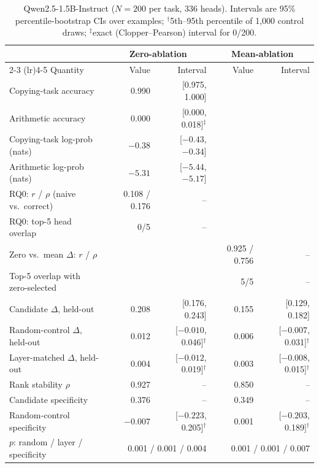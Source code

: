 \documentclass{article}
\begin{document}
\begin{table}[h]
  \caption{Qwen2.5-1.5B-Instruct ($N=200$ per task, 336 heads). Intervals
  are 95\% percentile-bootstrap CIs over examples; $^\dagger$5th--95th
  percentile of 1{,}000 control draws; $^\ddagger$exact (Clopper--Pearson)
  interval for 0/200.}
  \label{tab:qwen}
  \centering
  \small
  \setlength{\tabcolsep}{4pt}
  \begin{tabular}{lrrrr}
    \toprule
    & \multicolumn{2}{c}{Zero-ablation} & \multicolumn{2}{c}{Mean-ablation} \\
    \cmidrule(lr){2-3} \cmidrule(lr){4-5}
    Quantity & Value & Interval & Value & Interval \\
    \midrule
    Copying-task accuracy & 0.990 & [0.975, 1.000] & & \\
    Arithmetic accuracy & 0.000 & [0.000, 0.018]$^\ddagger$ & & \\
    Copying-task log-prob (nats) & $-0.38$ & [$-0.43$, $-0.34$] & & \\
    Arithmetic log-prob (nats) & $-5.31$ & [$-5.44$, $-5.17$] & & \\
    RQ0: $r$ / $\rho$ (naive vs.\ correct) & 0.108 / 0.176 & -- & & \\
    RQ0: top-5 head overlap & 0/5 & -- & & \\
    Zero vs.\ mean $\Delta$: $r$ / $\rho$ & & & 0.925 / 0.756 & -- \\
    Top-5 overlap with zero-selected & & & 5/5 & -- \\
    Candidate $\Delta$, held-out & 0.208 & [0.176, 0.243] & 0.155 & [0.129, 0.182] \\
    Random-control $\Delta$, held-out & 0.012 & [$-0.010$, 0.046]$^\dagger$ & 0.006 & [$-0.007$, 0.031]$^\dagger$ \\
    Layer-matched $\Delta$, held-out & 0.004 & [$-0.012$, 0.019]$^\dagger$ & 0.003 & [$-0.008$, 0.015]$^\dagger$ \\
    Rank stability $\rho$ & 0.927 & -- & 0.850 & -- \\
    Candidate specificity & 0.376 & -- & 0.349 & -- \\
    Random-control specificity & $-0.007$ & [$-0.223$, 0.205]$^\dagger$ & 0.001 & [$-0.203$, 0.189]$^\dagger$ \\
    $p$: random / layer / specificity & \multicolumn{2}{r}{0.001 / 0.001 / 0.004} & \multicolumn{2}{r}{0.001 / 0.001 / 0.007} \\
    \bottomrule
  \end{tabular}
\end{table}
\end{document}
